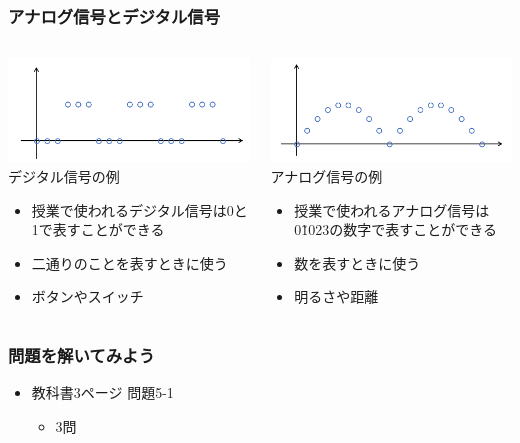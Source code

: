 \begin{frame}[fragile]
    \frametitle{アナログ信号とデジタル信号}
    \begin{columns}
        \begin{column}{0.48\textwidth}
            \includegraphics[width=\textwidth]{images/chap05/text05-img002.png} 
            {デジタル信号の例}
            \vspace{2pt}
            \begin{itemize}
                \item 授業で使われるデジタル信号は0と1で表すことができる
                \item 二通りのことを表すときに使う
                \item ボタンやスイッチ
            \end{itemize}
        \end{column}
        \begin{column}{0.48\textwidth}
            \includegraphics[width=\textwidth]{images/chap05/text05-img003.png} 
            {アナログ信号の例}
            \vspace{2pt}
            \begin{itemize}
                \item 授業で使われるアナログ信号は0\~1023の数字で表すことができる
                \item 数を表すときに使う
                \item 明るさや距離
            \end{itemize}
        \end{column}
    \end{columns}
\end{frame}

\begin{frame}[fragile]
    \frametitle{問題を解いてみよう}
    \begin{itemize}
        \item 教科書3ページ 問題5-1
        \begin{itemize}
            \item 3問
        \end{itemize}
    \end{itemize}
\end{frame}
